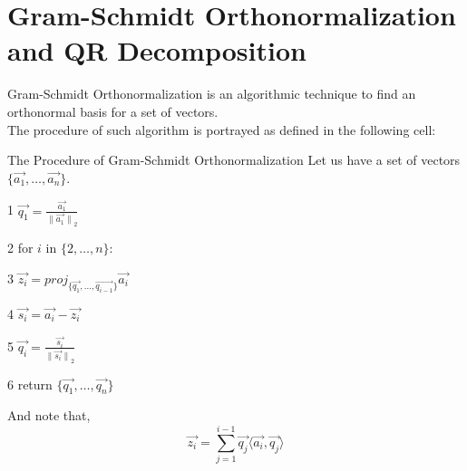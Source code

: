 \section{Gram-Schmidt Orthonormalization and QR Decomposition}
Gram-Schmidt Orthonormalization is an algorithmic technique to find an orthonormal basis for a set of vectors. \\
The procedure of such algorithm is portrayed as defined in the following cell:
\begin{ln-define}{The Procedure of Gram-Schmidt Orthonormalization}{}
    Let us have a set of vectors $\{\vec{a_1}, \dots, \vec{a_n}\}$.
    \begin{bindenum}
        \item[1] $\vec{q_1} = \frac{\vec{a_1}}{{\lVert \vec{a_1} \rVert}_2}$
        \item[2] for $i$ in $\{2, \dots, n\}$:
        \item[3] \hspace{0.6cm} $\vec{z_i} = {proj}_{\{\vec{q_1}, \dots, \vec{q_{i - 1}}\}} \vec{a_i}$
        \item[4] \hspace{0.6cm} $\vec{s_i} = \vec{a_i} - \vec{z_i}$
        \item[5] \hspace{0.6cm} $\vec{q_i} = \frac{\vec{s_i}}{{\lVert \vec{s_i} \rVert}_2}$
        \item[6] return $\{\vec{q_1}, \dots, \vec{q_n}\}$
    \end{bindenum}
    And note that,
    \[
        \vec{z_i} = \sum_{j = 1}^{i - 1} \vec{q_j} \langle \vec{a_i}, \vec{q_j} \rangle
    \]
\end{ln-define}
